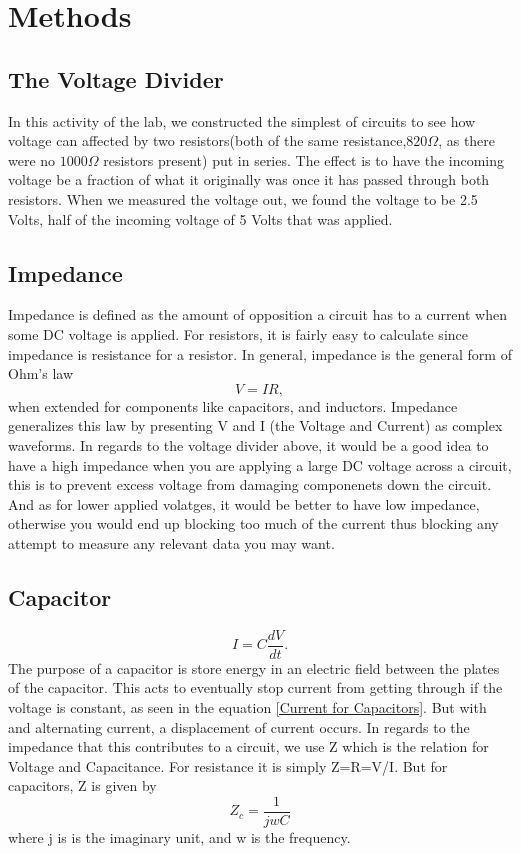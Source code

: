 \documentclass[12 pt]{article}
\begin{document}
\section{Methods}

\subsection{The Voltage Divider}
In this activity of the lab, we constructed the simplest of circuits to
see how voltage can affected by two resistors(both of the same
resistance,$ 820 \Omega$, as there were no $1000 \Omega$ resistors present) put in series. The effect
is to have the incoming voltage be a fraction of what it originally was
once it has passed through both resistors. When we measured the voltage
out, we found the voltage to be 2.5 Volts, half of the incoming voltage
of 5 Volts that was applied. 

\subsection{Impedance}
Impedance is defined as the amount of opposition a circuit has to a
current when some DC voltage is applied. For resistors, it is fairly
easy to calculate since impedance is resistance for a resistor. In
general, impedance is the general form of Ohm's law
\begin{equation}
  \label{Ohm's}
  V = IR,
\end{equation}
when extended for components like capacitors, and inductors. Impedance generalizes this law by presenting V and I (the Voltage and Current) as
complex waveforms. In regards to the voltage
divider above,  it would be a good idea to have a high impedance when
you are applying a large DC voltage across a circuit, this is to prevent
excess voltage from damaging componenets down the circuit. And as for
lower applied volatges, it would be better to have low impedance,
otherwise you would end up blocking too much of the current thus
blocking any attempt to measure any relevant data you may want. 

\subsection{Capacitor}
\begin{equation}
  \label{Current for Capacitors}
  I = C \frac{dV}{dt}.
\end{equation}
The purpose of a capacitor is store energy in an electric field between
the plates of the capacitor. This acts to eventually stop current from
getting through if the voltage is constant, as seen in the equation \ref{Current for Capacitors}. But with and alternating current, a
displacement of current occurs. In regards to the impedance that this
contributes to a circuit, we use Z which is the relation for Voltage and
Capacitance. For resistance it is simply Z=R=V/I. But for capacitors,  Z
is given by 
\begin{equation}
  \label{impedance for Capacitors}
  Z_c = \frac{1}{jwC}
\end{equation}
where j is is the imaginary unit, and w is the frequency.
\end{document}
